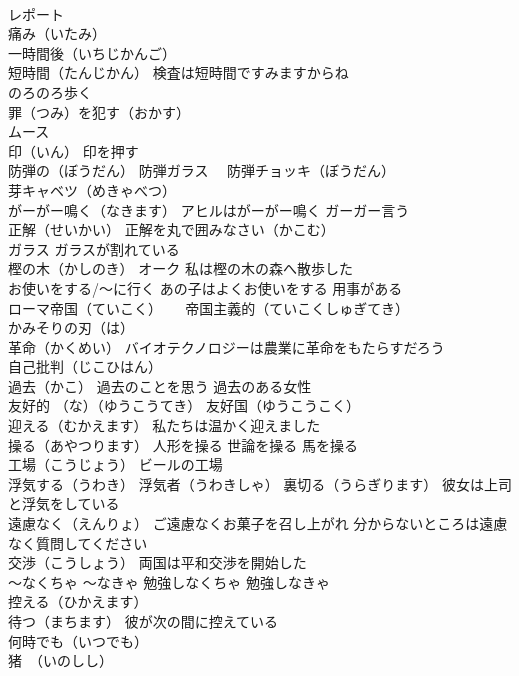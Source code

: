 \documentclass[8pt]{extreport}
\begin{document}
\begin{CJK}{UTF8}{min}
\\	レポート
\\	痛み（いたみ）
\\	一時間後（いちじかんご）
\\	短時間（たんじかん） 検査は短時間ですみますからね
\\	のろのろ歩く
\\	罪（つみ）を犯す（おかす）
\\	ムース
\\	印（いん） 印を押す
\\	防弾の（ぼうだん） 防弾ガラス　 防弾チョッキ（ぼうだん）
\\	芽キャベツ（めきゃべつ）
\\	がーがー鳴く（なきます） アヒルはがーがー鳴く ガーガー言う 
\\	正解（せいかい） 正解を丸で囲みなさい（かこむ）
\\	ガラス ガラスが割れている
\\	樫の木（かしのき） オーク 私は樫の木の森へ散歩した
\\	お使いをする/～に行く あの子はよくお使いをする 用事がある
\\	ローマ帝国（ていこく） 　 帝国主義的（ていこくしゅぎてき）
\\	かみそりの刃（は）
\\	革命（かくめい） バイオテクノロジーは農業に革命をもたらすだろう
\\	自己批判（じこひはん）
\\	過去（かこ） 過去のことを思う 過去のある女性
\\	友好的 （な）（ゆうこうてき） 友好国（ゆうこうこく）
\\	迎える（むかえます） 私たちは温かく迎えました
\\	操る（あやつります） 人形を操る 世論を操る 馬を操る
\\	工場（こうじょう） ビールの工場
\\	浮気する（うわき） 浮気者（うわきしゃ） 裏切る（うらぎります） 彼女は上司と浮気をしている
\\	遠慮なく（えんりょ） ご遠慮なくお菓子を召し上がれ 分からないところは遠慮なく質問してください
\\	交渉（こうしょう） 両国は平和交渉を開始した
\\	～なくちゃ ～なきゃ 勉強しなくちゃ 勉強しなきゃ
\\	控える（ひかえます） 
\\	待つ（まちます） 彼が次の間に控えている
\\	何時でも（いつでも）
\\	猪　（いのしし）

\end{CJK}
\end{document}
